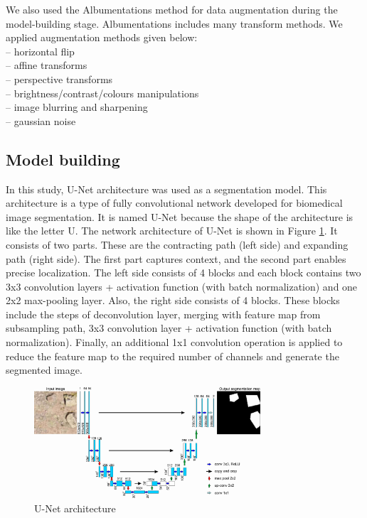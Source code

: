\documentclass[a4paper,fleqn]{cas-sc}
\begin{document}
We also used the Albumentations \citep{buslaev2020albumentations} method for data augmentation during the model-building stage. Albumentations includes many transform methods. We applied augmentation methods given below:\\
– horizontal flip\\
– affine transforms\\
– perspective transforms\\
– brightness/contrast/colours manipulations\\
– image blurring and sharpening\\
– gaussian noise\\

\subsection{Model building}
In this study, U-Net architecture \citep{ronneberger2015u} was used as a segmentation model. This architecture is a type of fully convolutional network developed for biomedical image segmentation. It is named U-Net because the shape of the architecture is like the letter U. The network architecture of U-Net is shown in Figure \ref{fig:Figure5}. It consists of two parts. These are the contracting path (left side) and expanding path (right side). The first part captures context, and the second part enables precise localization. The left side consists of 4 blocks and each block contains two 3x3 convolution layers + activation function (with batch normalization) and one 2x2 max-pooling layer. Also, the right side consists of 4 blocks. These blocks include the steps of deconvolution layer, merging with feature map from subsampling path, 3x3 convolution layer + activation function (with batch normalization). Finally, an additional 1x1 convolution operation is applied to reduce the feature map to the required number of channels and generate the segmented image.
\begin{figure}
	\centering
	\includegraphics[width=0.75\textwidth]{figures/fig5.jpg}
	\caption{U-Net architecture}
	\label{fig:Figure5}
\end{figure}
\end{document}

